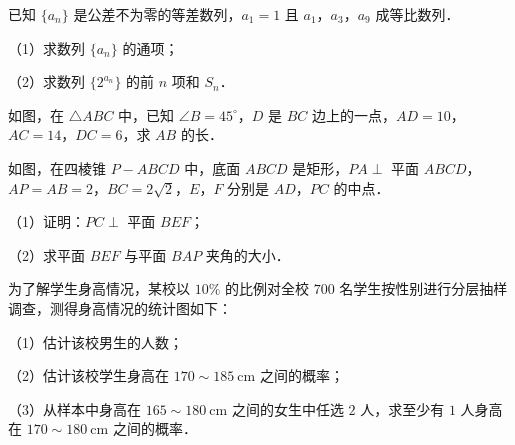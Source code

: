 \endgroup
{}
\begin{question}
已知 $\{a_n\}$ 是公差不为零的等差数列，$a_1=1$ 且 $a_1$，$a_3$，$a_9$ 成等比数列．

（1）求数列 $\{a_n\}$ 的通项；

（2）求数列 $\{2^{a_n}\}$ 的前 $n$ 项和 $S_n$．

\Needspace{0.4\textheight}
\end{question}
\begingroup
\renewenvironment{question}{\Needspace{0.5\textheight}}{}
\begin{question}
如图，在 $\triangle ABC$ 中，已知 $\angle B=45^\circ$，$D$ 是 $BC$ 边上的一点，$AD=10$，$AC=14$，$DC=6$，求 $AB$ 的长．
\nopagebreak[4]
\begin{center}\end{center}
\nopagebreak[4]
\Needspace{0.4\textheight}
\end{question}
\endgroup
\begingroup
\renewenvironment{question}{\Needspace{0.5\textheight}}{}
\begin{question}
如图，在四棱锥 $P-ABCD$ 中，底面 $ABCD$ 是矩形，$PA\perp$ 平面 $ABCD$，$AP=AB=2$，$BC=2\sqrt2$，$E$，$F$ 分别是 $AD$，$PC$ 的中点．

（1）证明：$PC\perp$ 平面 $BEF$；

（2）求平面 $BEF$ 与平面 $BAP$ 夹角的大小．
\nopagebreak[4]
\begin{center}\end{center}
\nopagebreak[4]
\Needspace{0.4\textheight}
\end{question}
\endgroup
\begingroup
\renewenvironment{question}{\Needspace{0.5\textheight}}{}
\begin{question}
为了解学生身高情况，某校以 $10\%$ 的比例对全校 $700$ 名学生按性别进行分层抽样调查，测得身高情况的统计图如下：

（1）估计该校男生的人数；

（2）估计该校学生身高在 $170\sim 185\ \mathrm{cm}$ 之间的概率；

（3）从样本中身高在 $165\sim 180\ \mathrm{cm}$ 之间的女生中任选 $2$ 人，求至少有 $1$ 人身高在 $170\sim 180\ \mathrm{cm}$ 之间的概率．
\nopagebreak[4]
\begin{center}\end{center}
\nopagebreak[4]
\Needspace{0.4\textheight}
\end{question}
\endgroup
\begingroup
\renewenvironment{question}{\Needspace{0.5\textheight}}{}
